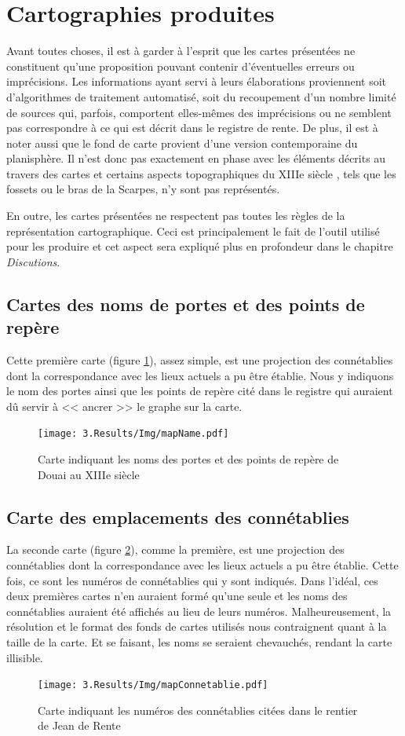 \section{Cartographies produites}
Avant toutes choses, il est à garder à l'esprit que les cartes présentées ne constituent qu'une proposition pouvant contenir d'éventuelles erreurs ou imprécisions. Les informations ayant servi à leurs élaborations proviennent soit d'algorithmes de traitement automatisé, soit du recoupement d'un nombre limité de sources qui, parfois, comportent elles-mêmes des imprécisions ou ne semblent pas correspondre à ce qui est décrit dans le registre de rente.
De plus, il est à noter aussi que le fond de carte provient d'une version contemporaine du planisphère. Il n'est donc pas exactement en phase avec les éléments décrits au travers des cartes et certains aspects topographiques du XIIIe siècle , tels que les fossets ou le bras de la Scarpes,  n'y sont pas représentés. 

En outre, les cartes présentées ne respectent pas toutes les règles de la représentation cartographique. Ceci est principalement le fait de l'outil utilisé pour les produire et cet aspect sera expliqué plus en profondeur dans le
chapitre \textit{Discutions}.
\subsection{Cartes des noms de portes et des points de repère}
Cette première carte (figure \ref{fig:mapName}), assez simple, est une projection des connétablies dont la correspondance avec les lieux actuels a pu être établie. Nous y indiquons le nom des portes ainsi que les points de repère cité dans le registre qui auraient dû servir à << ancrer >> le graphe sur la carte.
\begin{figure}
    \centering
    \texttt{[image: 3.Results/Img/mapName.pdf]}
    \caption{Carte indiquant les noms des portes et des points de repère de Douai au XIIIe siècle}
    \label{fig:mapName}
\end{figure}
\subsection{Carte des emplacements des connétablies}
La seconde carte (figure \ref{fig:mapConnetablie}), comme la première,  est une projection des connétablies dont la correspondance avec les lieux actuels a pu être établie. Cette fois,  ce sont les numéros de connétablies qui y sont indiqués. Dans l'idéal, ces deux premières cartes n'en auraient formé qu'une seule et les noms des connétablies auraient été affichés au lieu de leurs numéros. Malheureusement, la résolution et le format des fonds de cartes utilisés nous contraignent quant à la taille de la carte. Et se faisant, les noms se seraient chevauchés, rendant la carte illisible.
\begin{figure}
    \centering
    \texttt{[image: 3.Results/Img/mapConnetablie.pdf]}
    \caption{Carte indiquant les numéros des connétablies citées dans le rentier de Jean de Rente}
    \label{fig:mapConnetablie}
\end{figure}

